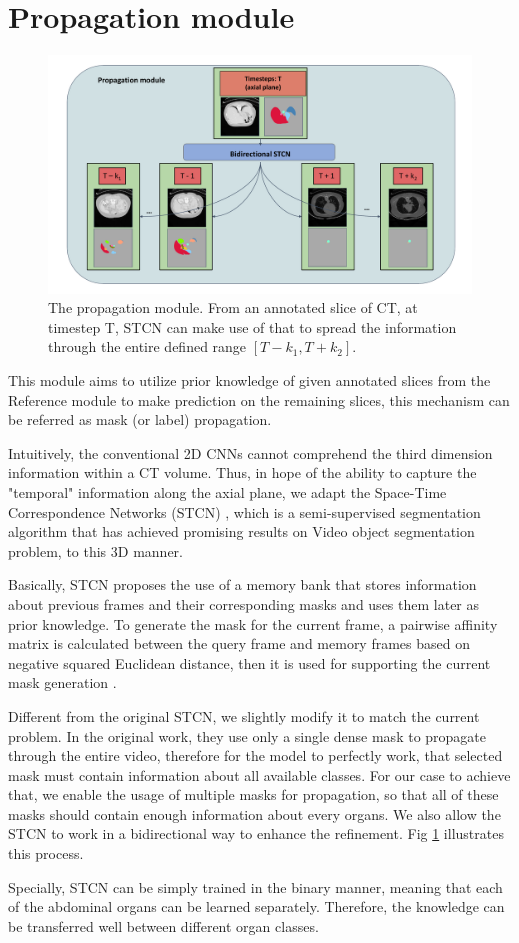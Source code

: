 \section{Propagation module}
\label{sec:propagation}
\begin{figure}[!h]
    \centering
    \includegraphics[width=\textwidth]{content/resources/new_images/propagation.pdf}
    \caption{The propagation module. From an annotated slice of CT, at timestep T, STCN can make use of that to spread the information through the entire defined range $[T-k_1, T+k_2]$.}
    \label{fig:propagation}
\end{figure}

This module aims to utilize prior knowledge of given annotated slices from the Reference module to make prediction on the remaining slices, this mechanism can be referred as mask (or label) propagation.

Intuitively, the conventional 2D CNNs cannot comprehend the third dimension information within a CT volume. Thus, in hope of the ability to capture the "temporal" information along the axial plane, we adapt the Space-Time Correspondence Networks (STCN) \cite{stcn21cheng}, which is a semi-supervised segmentation algorithm that has achieved promising results on Video object segmentation problem, to this 3D manner. 

Basically, STCN proposes the use of a memory bank that stores information about previous frames and their corresponding masks and uses them later as prior knowledge. To generate the mask for the current frame, a pairwise affinity matrix is calculated between the query frame and memory frames based on negative squared Euclidean distance, then it is used for supporting the current mask generation \cite{stcn21cheng}. 

Different from the original STCN, we slightly modify it to match the current problem. In the original work, they use only a single dense mask to propagate through the entire video, therefore for the model to perfectly work, that selected mask must contain information about all available classes. For our case to achieve that, we enable the usage of multiple masks for propagation, so that all of these masks should contain enough information about every organs. We also allow the STCN to work in a bidirectional way to enhance the refinement. Fig \ref{fig:propagation} illustrates this process.

Specially, STCN can be simply trained in the binary manner, meaning that each of the abdominal organs can be learned separately. Therefore, the knowledge can be transferred well between different organ classes.